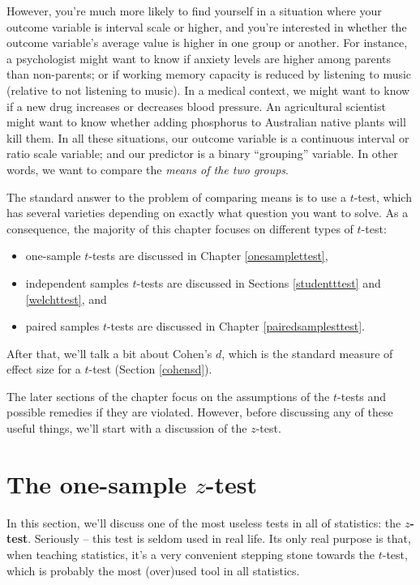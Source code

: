 \documentclass[
  11pt,
  a4paper,
  twoside,symmetric,openright]{book}
\providecommand{\tightlist}{%
  \setlength{\itemsep}{0pt}\setlength{\parskip}{0pt}}
\theoremstyle{break}
\theoremstyle{break}
\begin{document}
However, you're much more likely to find yourself in a situation where your outcome variable is interval scale or higher, and you're interested in whether the outcome variable's average value is higher in one group or another. For instance, a psychologist might want to know if anxiety levels are higher among parents than non-parents; or if working memory capacity is reduced by listening to music (relative to not listening to music). In a medical context, we might want to know if a new drug increases or decreases blood pressure. An agricultural scientist might want to know whether adding phosphorus to Australian native plants will kill them. In all these situations, our outcome variable is a continuous interval or ratio scale variable; and our predictor is a binary ``grouping'' variable. In other words, we want to compare the \emph{means of the two groups}.

The standard answer to the problem of comparing means is to use a \(t\)-test, which has several varieties depending on exactly what question you want to solve. As a consequence, the majority of this chapter focuses on different types of \(t\)-test:

\begin{itemize}
\tightlist
\item
  one-sample \(t\)-tests are discussed in Chapter \ref{onesamplettest},
\item
  independent samples \(t\)-tests are discussed in Sections \ref{studentttest} and \ref{welchttest}, and
\item
  paired samples \(t\)-tests are discussed in Chapter \ref{pairedsamplesttest}.
\end{itemize}

After that, we'll talk a bit about Cohen's \(d\), which is the standard measure of effect size for a \(t\)-test (Section \ref{cohensd}).

The later sections of the chapter focus on the assumptions of the \(t\)-tests and possible remedies if they are violated. However, before discussing any of these useful things, we'll start with a discussion of the \(z\)-test.

\section{\texorpdfstring{The one-sample \(z\)-test}{The one-sample z-test}}\label{ztest}

In this section, we'll discuss one of the most useless tests in all of statistics: the \textbf{\(z\)-test}. Seriously -- this test is seldom used in real life. Its only real purpose is that, when teaching statistics, it's a very convenient stepping stone towards the \(t\)-test, which is probably the most (over)used tool in all statistics.
\end{document}
